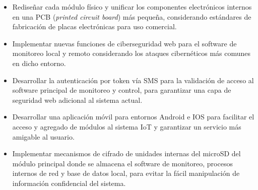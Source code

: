 \begin{itemize}

\item Rediseñar cada módulo físico y unificar los componentes electrónicos internos en una PCB (\emph{printed circuit board}) más pequeña, considerando estándares de fabricación de placas electrónicas para uso comercial.


\item Implementar nuevas funciones de ciberseguridad web para el software de monitoreo local y remoto considerando los ataques cibernéticos más comunes en dicho entorno.

\item Desarrollar la autenticación por token vía SMS para la validación de acceso al software principal de monitoreo y control, para garantizar una capa de seguridad web adicional al sistema actual.

\item Desarrollar una aplicación móvil para entornos Android e IOS para facilitar el acceso y agregado de módulos al sistema IoT y garantizar un servicio más amigable al usuario.

\item Implementar mecanismos de cifrado de unidades internas del microSD del módulo principal donde se almacena el software de monitoreo, procesos internos de red y base de datos local, para evitar la fácil manipulación de información confidencial del sistema.
\end{itemize}
